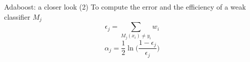 \begin{frame}{Adaboost: a closer look (2)}
To compute the error and the efficiency of a weak classifier $M_j$
\begin{equation*}
\epsilon_j = \sum_{M_j(x_i)\neq y_i} w_i
\end{equation*}
\begin{equation*}
\alpha_j = \frac{1}{2} \ln\bigg(\frac{1-\epsilon_j}{\epsilon_j}\bigg)
\end{equation*}
\end{frame}
